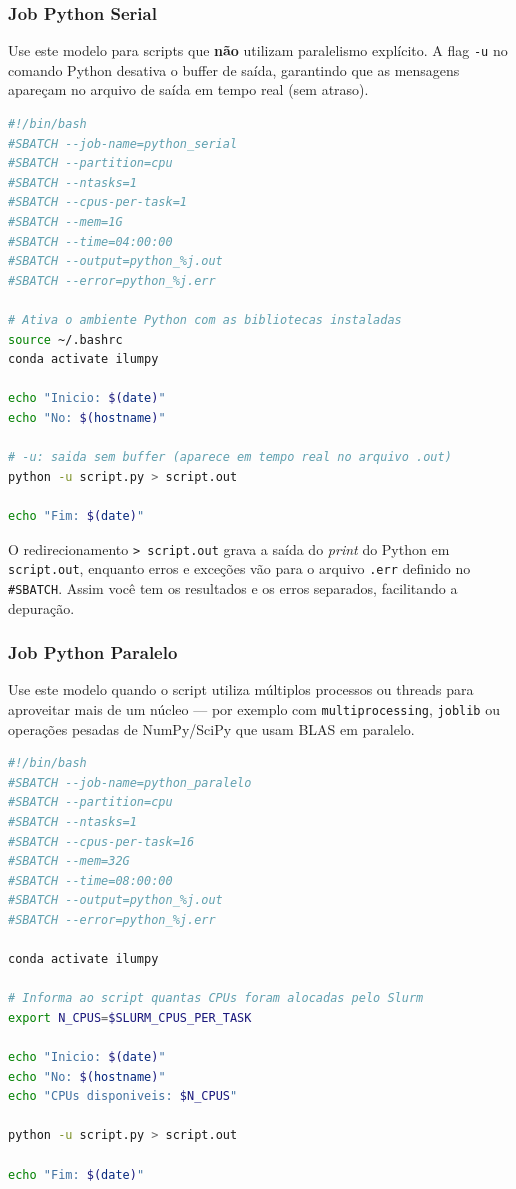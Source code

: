 \documentclass[11pt, a4paper]{article}
\begin{document}
\subsubsection{Job Python Serial}

Use este modelo para scripts que \textbf{não} utilizam paralelismo explícito.
A flag \texttt{-u} no comando Python desativa o buffer de saída, garantindo
que as mensagens apareçam no arquivo de saída em tempo real (sem atraso).

\begin{lstlisting}[style=script, language=bash]
#!/bin/bash
#SBATCH --job-name=python_serial
#SBATCH --partition=cpu
#SBATCH --ntasks=1
#SBATCH --cpus-per-task=1
#SBATCH --mem=1G
#SBATCH --time=04:00:00
#SBATCH --output=python_%j.out
#SBATCH --error=python_%j.err

# Ativa o ambiente Python com as bibliotecas instaladas
source ~/.bashrc
conda activate ilumpy

echo "Inicio: $(date)"
echo "No: $(hostname)"

# -u: saida sem buffer (aparece em tempo real no arquivo .out)
python -u script.py > script.out

echo "Fim: $(date)"
\end{lstlisting}

\begin{dica}
  O redirecionamento \texttt{> script.out} grava a saída do \emph{print}
  do Python em \texttt{script.out}, enquanto erros e exceções vão para o
  arquivo \texttt{.err} definido no \texttt{\#SBATCH}. Assim você tem os
  resultados e os erros separados, facilitando a depuração.
\end{dica}

\subsubsection{Job Python Paralelo}

Use este modelo quando o script utiliza múltiplos processos ou threads
para aproveitar mais de um núcleo --- por exemplo com \texttt{multiprocessing},
\texttt{joblib} ou operações pesadas de NumPy/SciPy que usam BLAS em paralelo.

\begin{lstlisting}[style=script, language=bash]
#!/bin/bash
#SBATCH --job-name=python_paralelo
#SBATCH --partition=cpu
#SBATCH --ntasks=1
#SBATCH --cpus-per-task=16
#SBATCH --mem=32G
#SBATCH --time=08:00:00
#SBATCH --output=python_%j.out
#SBATCH --error=python_%j.err

conda activate ilumpy

# Informa ao script quantas CPUs foram alocadas pelo Slurm
export N_CPUS=$SLURM_CPUS_PER_TASK

echo "Inicio: $(date)"
echo "No: $(hostname)"
echo "CPUs disponiveis: $N_CPUS"

python -u script.py > script.out

echo "Fim: $(date)"
\end{lstlisting}
\end{document}
